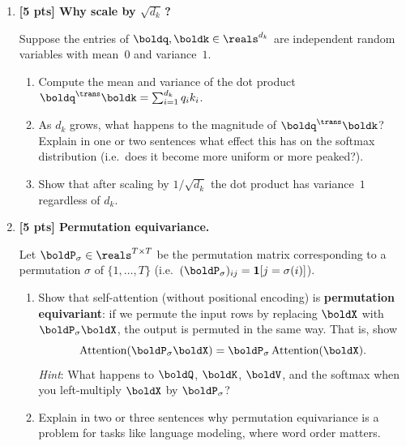 \documentclass[submit]{harvardml}
\begin{document}
\begin{problem}
\begin{enumerate}
\begin{enumerate}
  \item Compute the scaled score matrix $\boldS / \sqrt{d_k}$.
  Then apply softmax row-wise to obtain the attention weight matrix
  $\boldA \in \reals^{2 \times 2}$.

  You may leave your answer in terms of $e^{(\cdot)}$ and sums, or compute
  decimal approximations.
\end{enumerate}
\item \textbf{[5 pts] Why scale by $\sqrt{d_k}$\,?}

Suppose the entries of $\boldq, \boldk \in \reals^{d_k}$ are independent random
variables with mean~$0$ and variance~$1$.

\begin{enumerate}
  \item Compute the mean and variance of the dot product
  $\boldq^\trans \boldk = \sum_{i=1}^{d_k} q_i k_i$.

  \item As $d_k$ grows, what happens to the magnitude of $\boldq^\trans \boldk$?
  Explain in one or two sentences what effect this has on the softmax distribution
  (i.e.\ does it become more uniform or more peaked?).

  \item Show that after scaling by $1/\sqrt{d_k}$ the dot product has variance~$1$
  regardless of $d_k$.
\end{enumerate}

\item \textbf{[5 pts] Permutation equivariance.}

Let $\boldP_\sigma \in \reals^{T \times T}$ be the permutation matrix corresponding
to a permutation $\sigma$ of $\{1, \dots, T\}$ (i.e.\ $(\boldP_\sigma)_{ij} =
\mathbf{1}[j = \sigma(i)]$).

\begin{enumerate}
  \item Show that self-attention (without positional encoding) is
  \textbf{permutation equivariant}: if we permute the input rows by replacing
  $\boldX$ with $\boldP_\sigma \boldX$, the output is permuted in the same way.
  That is, show
  \[
    \text{Attention}(\boldP_\sigma \boldX) = \boldP_\sigma \, \text{Attention}(\boldX).
  \]
  \textit{Hint}: What happens to $\boldQ$, $\boldK$, $\boldV$, and the softmax
  when you left-multiply $\boldX$ by $\boldP_\sigma$?

  \item Explain in two or three sentences why permutation equivariance is a
  problem for tasks like language modeling, where word order matters.


\end{enumerate}
\end{enumerate}
\end{problem}
\end{document}
